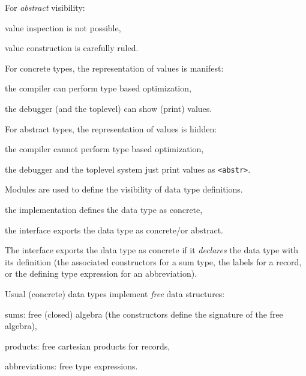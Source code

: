 For {\em abstract} visibility:

\begin{citemize}
\item value inspection is not possible,
\item value construction is carefully ruled.
\end{citemize}


For concrete types, the representation of values is manifest:

\begin{citemize}
\item the compiler can perform type based optimization,
\item the debugger (and the toplevel) can show (print) values.
\end{citemize}

For abstract types, the representation of values is hidden:
\begin{citemize}
\item the compiler cannot perform type based optimization,
\item the debugger and the toplevel system just print values as \verb"<abstr>".
\end{citemize}


Modules are used to define the visibility of data type definitions.

\begin{citemize}
  \item the implementation defines the data type as concrete,
  \item the interface exports the data type as concrete/or abstract.
\end{citemize}

The interface exports the data type as concrete if it {\em declares} the data
type with its definition (the associated constructors for a sum type, the labels for
a record, or the defining type expression for an abbreviation).


Usual (concrete) data types implement {\em free} data structures:
\begin{citemize}
  \item sums: free (closed) algebra (the constructors define the
signature of the free algebra),
  \item products: free cartesian products for records,
  \item abbreviations: free type expressions.
\end{citemize}

